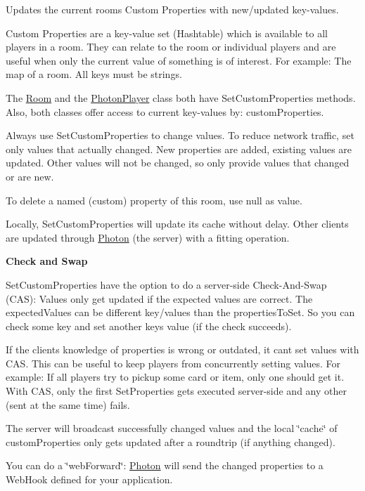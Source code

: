 Updates the current room\textquotesingle{}s Custom Properties with new/updated key-\/values. 

Custom Properties are a key-\/value set (Hashtable) which is available to all players in a room. They can relate to the room or individual players and are useful when only the current value of something is of interest. For example\+: The map of a room. All keys must be strings.

The \hyperlink{class_room}{Room} and the \hyperlink{class_photon_player}{Photon\+Player} class both have Set\+Custom\+Properties methods. Also, both classes offer access to current key-\/values by\+: custom\+Properties.

Always use Set\+Custom\+Properties to change values. To reduce network traffic, set only values that actually changed. New properties are added, existing values are updated. Other values will not be changed, so only provide values that changed or are new.

To delete a named (custom) property of this room, use null as value.

Locally, Set\+Custom\+Properties will update it\textquotesingle{}s cache without delay. Other clients are updated through \hyperlink{namespace_photon}{Photon} (the server) with a fitting operation.

{\bfseries Check and Swap}

Set\+Custom\+Properties have the option to do a server-\/side Check-\/\+And-\/\+Swap (C\+AS)\+: Values only get updated if the expected values are correct. The expected\+Values can be different key/values than the properties\+To\+Set. So you can check some key and set another key\textquotesingle{}s value (if the check succeeds).

If the client\textquotesingle{}s knowledge of properties is wrong or outdated, it can\textquotesingle{}t set values with C\+AS. This can be useful to keep players from concurrently setting values. For example\+: If all players try to pickup some card or item, only one should get it. With C\+AS, only the first Set\+Properties gets executed server-\/side and any other (sent at the same time) fails.

The server will broadcast successfully changed values and the local \char`\"{}cache\char`\"{} of custom\+Properties only gets updated after a roundtrip (if anything changed).

You can do a \char`\"{}web\+Forward\char`\"{}\+: \hyperlink{namespace_photon}{Photon} will send the changed properties to a Web\+Hook defined for your application.

